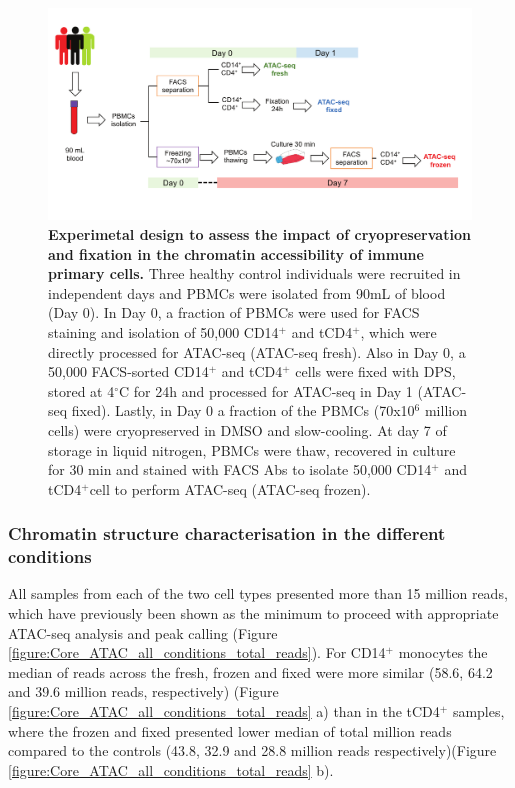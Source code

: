 \begin{landscape}
\begin{figure}[H]
\centering
\includegraphics[width=1.2\textwidth]{./Results1/pdfs/Chapter3_core_experimental_design}
\caption[Experimetal design to assess the impact of cryopreservation and fixation in the chromatin accessibility of immune primary cells.]{\textbf{Experimetal design to assess the impact of cryopreservation and fixation in the chromatin accessibility of immune primary cells.} Three healthy control individuals were recruited in independent days and PBMCs were isolated from 90mL of blood (Day 0). In Day 0, a fraction of PBMCs were used for FACS staining and isolation of 50,000 CD14$^+$ and tCD4$^+$, which were directly processed for ATAC-seq (ATAC-seq fresh). Also in Day 0, a 50,000 FACS-sorted CD14$^+$ and tCD4$^+$ cells were fixed with DPS, stored at 4{$^\circ$}C for 24h and processed for ATAC-seq in Day 1 (ATAC-seq fixed). Lastly, in Day 0 a fraction of the PBMCs (70x10$^6$ million cells) were cryopreserved in DMSO and slow-cooling. At day 7 of storage in liquid nitrogen, PBMCs were thaw, recovered in culture for 30 min and stained with FACS Abs to isolate 50,000 CD14$^+$ and tCD4$^+$cell to perform ATAC-seq (ATAC-seq frozen).}
\label{figure:Core_experimental_design}
\end{figure}
\end{landscape}



\subsubsection{Chromatin structure characterisation in the different conditions}

All samples from each of the two cell types presented more than 15 million reads, which have previously been shown as the minimum to proceed with appropriate ATAC-seq analysis and peak calling (Figure \ref{figure:Core_ATAC_all_conditions_total_reads}). For CD14$^+$ monocytes the median of reads across the fresh, frozen and fixed were more similar (58.6, 64.2 and 39.6 million reads, respectively) (Figure \ref{figure:Core_ATAC_all_conditions_total_reads} a) than in the tCD4$^+$ samples, where the frozen and fixed presented lower median of total million reads compared to the controls (43.8, 32.9 and 28.8 million reads respectively)(Figure \ref{figure:Core_ATAC_all_conditions_total_reads} b).

